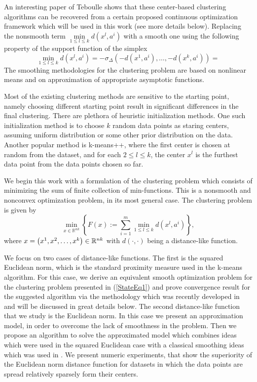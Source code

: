 An interesting paper of Teboulle \cite{T2007} shows that these center-based clustering algorithms can be recovered from a certain proposed continuous optimization framework which will be used in this work (see more details below). Replacing the nonsmooth term $\min\limits_{1 \leq l \leq k} d\left(x^l,a^i\right)$ with a smooth one using the following property of the support function of the simplex
\begin{equation*}
	\min\limits_{1 \leq l \leq k} d\left(x^l,a^i\right) = -\sigma_{\Delta}\left(-d\left(x^1,a^i\right),\ldots,-d\left(x^k,a^i\right)\right) = 
\end{equation*}
The smoothing methodologies for the clustering problem are based on nonlinear means and on approximation of appropriate asymptotic functions. \medskip

Most of the existing clustering methods are sensitive to the starting point, namely choosing different starting point result in significant differences in the final clustering. There are plethora of heuristic initialization methods. One such initialization method is to choose $k$ random data points as staring centers, assuming uniform distribution or some other prior distribution on the data. Another popular method is k-means++, where the first center is chosen at random from the dataset, and for each $2 \leq l \leq k$, the center $x^l$ is the furthest data point from the data points chosen so far. \medskip

We begin this work with a formulation of the clustering problem which consists of minimizing the sum of finite collection of min-functions. This is a nonsmooth and nonconvex optimization problem, in its most general case. The clustering problem is given by
\begin{equation}
	\min\limits_{x \in \mathbb{R}^{nk}} \left\lbrace F(x) := \sum\limits_{i=1}^{m} \min\limits_{1 \le l \le k} d(x^l,a^i) \right\rbrace , \label{StateEq1}
\end{equation}
where $x=\left( x^1,x^2, \ldots, x^k \right) \in \mathbb{R}^{nk}$ with $\textit{d}(\cdot ,\cdot)$ being a distance-like function. \medskip

We focus on two cases of distance-like functions. The first is the squared Euclidean norm, which is the standard proximity measure used in the k-means algorithm. For this case, we derive an equivalent smooth optimization problem for the clustering problem presented in (\ref{StateEq1}) and prove convergence result for the suggested algorithm via the methodology which was recently developed in \cite{BST2014} and will be discussed in great details below. The second distance-like function that we study is the Euclidean norm. In this case we present an approximation model, in order to overcome the lack of smoothness in the problem. Then we propose an algorithm to solve the approximated model which combines ideas which were used in the squared Euclidean case with a classical smoothing ideas which was used in \cite{BS2015}. We present numeric experiments, that show the superiority of the Euclidean norm distance function for datasets in which the data points are spread relatively sparsely form their centers. \medskip

